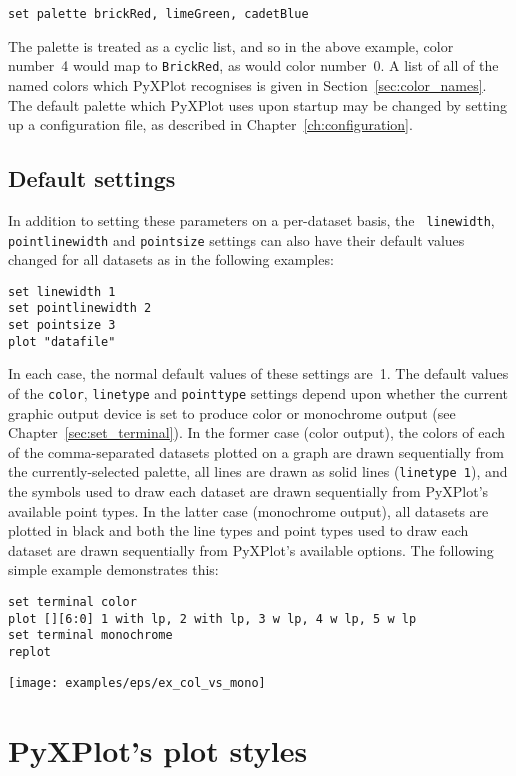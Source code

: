 \begin{verbatim}
set palette brickRed, limeGreen, cadetBlue
\end{verbatim}

\noindent The palette is treated as a cyclic list, and so in the above example,
color number~4 would map to {\tt BrickRed}, as would color number~0. A list
of all of the named colors which PyXPlot recognises is given in
Section~\ref{sec:color_names}. The default palette which PyXPlot uses upon
startup may be changed by setting up a configuration file, as described in
Chapter~\ref{ch:configuration}.

\subsection{Default settings}

In addition to setting these parameters on a per-dataset basis, the {\tt
linewidth}, {\tt pointlinewidth} and {\tt pointsize} settings can also have
their default values changed for all datasets as in the following examples:
\begin{verbatim}
set linewidth 1
set pointlinewidth 2
set pointsize 3
plot "datafile"
\end{verbatim}
In each case, the normal default values of these settings are~1. The default
values of the {\tt color}, {\tt linetype} and {\tt pointtype} settings depend
upon whether the current graphic output device is set to produce color or
monochrome output (see Chapter~\ref{sec:set_terminal}). In the former case
(color output), the colors of each of the comma-separated datasets plotted on
a graph are drawn sequentially from the currently-selected palette, all lines
are drawn as solid lines ({\tt line\-type~1}), and the symbols used to draw
each dataset are drawn sequentially from PyXPlot's available point types. In
the latter case (monochrome output), all datasets are plotted in black and
both the line types and point types used to draw each dataset are drawn
sequentially from PyXPlot's available options. The following simple example
demonstrates this:
\begin{verbatim}
set terminal color
plot [][6:0] 1 with lp, 2 with lp, 3 w lp, 4 w lp, 5 w lp
set terminal monochrome
replot
\end{verbatim}
\centerline{\texttt{[image: examples/eps/ex\_col\_vs\_mono]}}

\section{PyXPlot's plot styles}
\label{sec:list_of_plotstyles}

